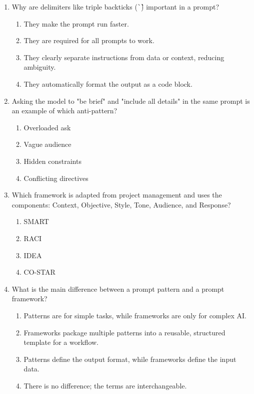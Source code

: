 \documentclass{article}
\begin{document}
\begin{enumerate}
    \item Why are delimiters like triple backticks (\texttt{\`\`\`}) important in a prompt?
    \begin{enumerate}
        \item They make the prompt run faster.
        \item They are required for all prompts to work.
        \item They clearly separate instructions from data or context, reducing ambiguity.
        \item They automatically format the output as a code block.
    \end{enumerate}

    \item Asking the model to "be brief" and "include all details" in the same prompt is an example of which anti-pattern?
    \begin{enumerate}
        \item Overloaded ask
        \item Vague audience
        \item Hidden constraints
        \item Conflicting directives
    \end{enumerate}

    \item Which framework is adapted from project management and uses the components: Context, Objective, Style, Tone, Audience, and Response?
    \begin{enumerate}
        \item SMART
        \item RACI
        \item IDEA
        \item CO-STAR
    \end{enumerate}

    \item What is the main difference between a prompt pattern and a prompt framework?
    \begin{enumerate}
        \item Patterns are for simple tasks, while frameworks are only for complex AI.
        \item Frameworks package multiple patterns into a reusable, structured template for a workflow.
        \item Patterns define the output format, while frameworks define the input data.
        \item There is no difference; the terms are interchangeable.
    \end{enumerate}


\end{enumerate}
\end{document}
